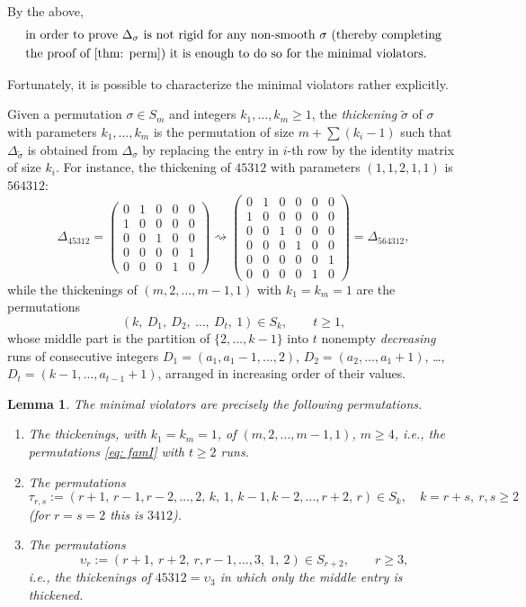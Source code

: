 \documentclass[12pt]{article}
\newtheorem{lemma}[theorem]{Lemma}
\newcommand{\IM}{\Delta}
\begin{document}
By the above,
\begin{equation} \label{quote: minviolsuffice}
\begin{aligned}
&\text{in order to prove $\IM_\sigma$ is not rigid for any non-smooth $\sigma$ (thereby completing}\\
&\text{the proof of \cref{thm: perm}) it is enough to do so for the minimal violators.}
\end{aligned}
\end{equation}

Fortunately, it is possible to characterize the minimal violators rather explicitly.

Given a permutation $\sigma\in S_m$ and integers $k_1,\dots,k_m\ge1$, the \emph{thickening} $\tilde\sigma$ of $\sigma$ with parameters $k_1,\dots,k_m$
is the permutation of size $m+\sum(k_i-1)$ such that $\IM_{\tilde\sigma}$ is obtained from $\IM_\sigma$ by replacing the entry in $i$-th row by the identity matrix of size $k_i$.
For instance, the thickening of $45312$ with parameters $(1,1,2,1,1)$ is $564312$:
\[
\IM_{45312}=
\begin{pmatrix}0&1&0&0&0\\1&0&0&0&0\\0&0&1&0&0\\0&0&0&0&1\\0&0&0&1&0\end{pmatrix}
\rightsquigarrow
\begin{pmatrix}0&1&0&0&0&0\\1&0&0&0&0&0\\0&0&1&0&0&0\\0&0&0&1&0&0\\0&0&0&0&0&1\\0&0&0&0&1&0\end{pmatrix}
=\IM_{564312},
\]
while the thickenings of $(m,2,\dots,m-1,1)$ with $k_1=k_m=1$ are the permutations
\begin{equation} \label{eq: famI}
(k,\ D_1,\ D_2,\ \dots,\ D_t,\ 1)\in S_k,\qquad t\ge1,
\end{equation}
whose middle part is the partition of $\{2,\dots,k-1\}$ into $t$ nonempty \emph{decreasing} runs of consecutive
integers $D_1=(a_1,a_1-1,\dots,2)$, $D_2=(a_2,\dots,a_1+1)$, \dots, $D_t=(k-1,\dots,a_{t-1}+1)$,
arranged in increasing order of their values.

\begin{lemma} \label{lem: minviol}
The minimal violators are precisely the following permutations.
\begin{enumerate}
\item \label{part: mvI} The thickenings, with $k_1=k_m=1$, of $(m,2,\dots,m-1,1)$, $m\ge4$, i.e., the permutations \cref{eq: famI} with $t\ge2$ runs.
\item \label{part: mvII} The permutations
\[
\tau_{r,s}:=(r+1,\,r-1,r-2,\dots,2,\,k,\,1,\,k-1,k-2,\dots,r+2,\,r)\in S_k,\quad k=r+s,\ r,s\ge2
\]
(for $r=s=2$ this is $3412$).
\item \label{part: mvIII} The permutations
\[
\upsilon_r:=(r+1,\ r+2,\ r,r-1,\dots,3,\ 1,\ 2)\in S_{r+2},\qquad r\ge3,
\]
i.e., the thickenings of $45312=\upsilon_3$ in which only the middle entry is thickened.
\end{enumerate}
\end{lemma}
\end{document}
